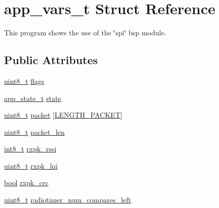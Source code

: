 \hypertarget{structapp__vars__t}{}\section{app\+\_\+vars\+\_\+t Struct Reference}
\label{structapp__vars__t}


This program shows the use of the \char`\"{}spi\char`\"{} bsp module.  


\subsection*{Public Attributes}
\begin{DoxyCompactItemize}
\item 
\hyperlink{_p_e___types_8h_aba7bc1797add20fe3efdf37ced1182c5}{uint8\+\_\+t} \hyperlink{structapp__vars__t_a2fdfa7c8a87176744b662d4b387df23e}{flags}
\item 
\hyperlink{agilefox_200std__low__power__mode_200std__low__power__mode_8c_a5bb27460721cc90620d197fabf50d4bb}{app\+\_\+state\+\_\+t} \hyperlink{structapp__vars__t_a6ead57edd284a2bb41867442f7846518}{state}
\item 
\hyperlink{_p_e___types_8h_aba7bc1797add20fe3efdf37ced1182c5}{uint8\+\_\+t} \hyperlink{structapp__vars__t_a4f3dd89ed254d75dd826b5a46e061fd2}{packet} \mbox{[}\hyperlink{samr21__xpro_200std__low__power__mode_200std__low__power__mode_8c_ab23dc632cb92506d08a47330e5869366}{L\+E\+N\+G\+T\+H\+\_\+\+P\+A\+C\+K\+ET}\mbox{]}
\item 
\hyperlink{_p_e___types_8h_aba7bc1797add20fe3efdf37ced1182c5}{uint8\+\_\+t} \hyperlink{structapp__vars__t_adc518008afbfd51f0719c4b17c7ae5d7}{packet\+\_\+len}
\item 
\hyperlink{_p_e___types_8h_aef44329758059c91c76d334e8fc09700}{int8\+\_\+t} \hyperlink{structapp__vars__t_aa8ca5ecdac56672f79206632354e5ee3}{rxpk\+\_\+rssi}
\item 
\hyperlink{_p_e___types_8h_aba7bc1797add20fe3efdf37ced1182c5}{uint8\+\_\+t} \hyperlink{structapp__vars__t_ad66d74916e8d21e075973dc7809b66ac}{rxpk\+\_\+lqi}
\item 
\hyperlink{_p_e___types_8h_a97a80ca1602ebf2303258971a2c938e2}{bool} \hyperlink{structapp__vars__t_aaf85edfe86a3d6a0c12013e06fd7f8da}{rxpk\+\_\+crc}
\item 
\hyperlink{_p_e___types_8h_aba7bc1797add20fe3efdf37ced1182c5}{uint8\+\_\+t} \hyperlink{structapp__vars__t_ada7421f16ec31b557044615641638b41}{radiotimer\+\_\+num\+\_\+compares\+\_\+left}
\item 

\end{DoxyCompactItemize}
